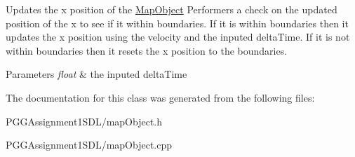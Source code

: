 Updates the x position of the \hyperlink{class_map_object}{Map\+Object} Performers a check on the updated position of the x to see if it within boundaries. If it is within boundaries then it updates the x position using the velocity and the inputed delta\+Time. If it is not within boundaries then it resets the x position to the boundaries. 
\begin{DoxyParams}{Parameters}
{\em float} & the inputed delta\+Time \\
\hline
\end{DoxyParams}


The documentation for this class was generated from the following files\+:\begin{DoxyCompactItemize}
\item 
P\+G\+G\+Assignment1\+S\+D\+L/map\+Object.\+h\item 
P\+G\+G\+Assignment1\+S\+D\+L/map\+Object.\+cpp\end{DoxyCompactItemize}
